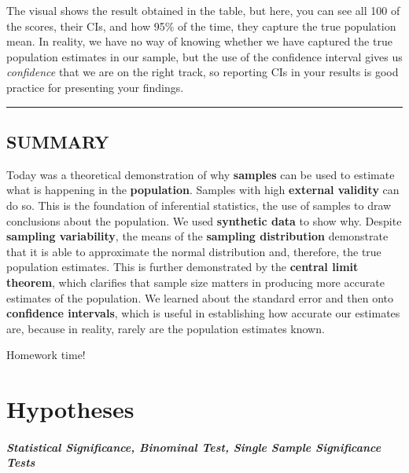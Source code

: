 \documentclass[
]{book}
\begin{document}
The visual shows the result obtained in the table, but here, you can see all 100 of the scores, their CIs, and how 95\% of the time, they capture the true population mean. In reality, we have no way of knowing whether we have captured the true population estimates in our sample, but the use of the confidence interval gives us \emph{confidence} that we are on the right track, so reporting CIs in your results is good practice for presenting your findings.

\begin{center}\rule{0.5\linewidth}{0.5pt}\end{center}

\hypertarget{summary-4}{%
\section{SUMMARY}\label{summary-4}}

Today was a theoretical demonstration of why \textbf{samples} can be used to estimate what is happening in the \textbf{population}. Samples with high \textbf{external validity} can do so. This is the foundation of inferential statistics, the use of samples to draw conclusions about the population. We used \textbf{synthetic data} to show why. Despite \textbf{sampling variability}, the means of the \textbf{sampling distribution} demonstrate that it is able to approximate the normal distribution and, therefore, the true population estimates. This is further demonstrated by the \textbf{central limit theorem}, which clarifies that sample size matters in producing more accurate estimates of the population. We learned about the standard error and then onto \textbf{confidence intervals}, which is useful in establishing how accurate our estimates are, because in reality, rarely are the population estimates known.

Homework time!

\hypertarget{hypotheses}{%
\chapter{Hypotheses}\label{hypotheses}}

\hypertarget{statistical-significance-binominal-test-single-sample-significance-tests}{%
\subsubsection*{\texorpdfstring{\emph{Statistical Significance, Binominal Test, Single Sample Significance Tests}}{Statistical Significance, Binominal Test, Single Sample Significance Tests}}\label{statistical-significance-binominal-test-single-sample-significance-tests}}
\end{document}

